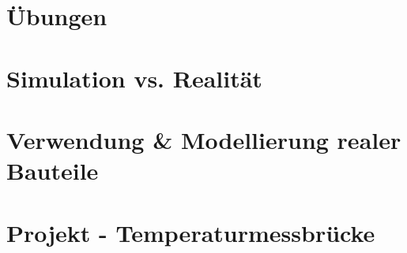 \documentclass{beamer}
\begin{document}
\section{Übungen}


\section{Simulation vs. Realität}


\section{Verwendung \& Modellierung realer Bauteile}




\section{Projekt - Temperaturmessbrücke}



\end{document}
